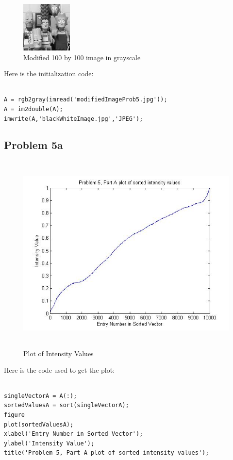 \documentclass[11pt,psfig]{article}
\begin{document}
\begin{figure}[H]
\centering
\includegraphics[height=1in]{blackWhiteImage.jpg}
\caption{Modified 100 by 100 image in grayscale}
\end{figure}

Here is the initialization code:

\begin{verbatim}

A = rgb2gray(imread('modifiedImageProb5.jpg'));
A = im2double(A);
imwrite(A,'blackWhiteImage.jpg','JPEG');

\end{verbatim}

\subsection*{Problem 5a}

\begin{figure}[H]
\centering
\includegraphics[height=4in]{prob5partAplot.jpg}
\caption{Plot of Intensity Values}
\end{figure}

Here is the code used to get the plot:

\begin{verbatim}

singleVectorA = A(:);
sortedValuesA = sort(singleVectorA);
figure
plot(sortedValuesA);
xlabel('Entry Number in Sorted Vector');
ylabel('Intensity Value');
title('Problem 5, Part A plot of sorted intensity values');

\end{verbatim}
\end{document}
